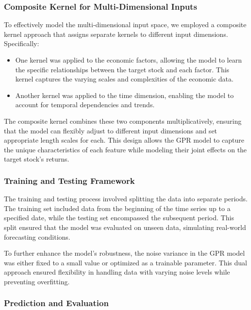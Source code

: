 \subsubsection{Composite Kernel for Multi-Dimensional Inputs}

To effectively model the multi-dimensional input space, we employed a composite kernel approach that assigns separate kernels to different input dimensions. Specifically:

\begin{itemize}
    \item One kernel was applied to the economic factors, allowing the model to learn the specific relationships between the target stock and each factor. This kernel captures the varying scales and complexities of the economic data.
    \item Another kernel was applied to the time dimension, enabling the model to account for temporal dependencies and trends. 
\end{itemize}

The composite kernel combines these two components multiplicatively, ensuring that the model can flexibly adjust to different input dimensions and set appropriate length scales for each. This design allows the GPR model to capture the unique characteristics of each feature while modeling their joint effects on the target stock's returns.

\subsubsection{Training and Testing Framework}

The training and testing process involved splitting the data into separate periods. The training set included data from the beginning of the time series up to a specified date, while the testing set encompassed the subsequent period. This split ensured that the model was evaluated on unseen data, simulating real-world forecasting conditions.

To further enhance the model's robustness, the noise variance in the GPR model was either fixed to a small value or optimized as a trainable parameter. This dual approach ensured flexibility in handling data with varying noise levels while preventing overfitting.

\subsubsection{Prediction and Evaluation}

